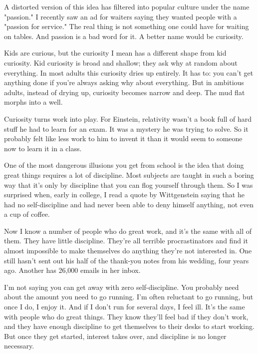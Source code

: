 A distorted version of this idea has
                  filtered into popular culture under the name "passion." I
                  recently saw an ad for waiters saying they wanted people with
                  a "passion for service." The real thing is not something one
                  could have for waiting on tables. And passion is a bad word
                  for it. A better name would be curiosity.

Kids are
                  curious, but the curiosity I mean has a different shape from
                  kid curiosity. Kid curiosity is broad and shallow; they ask
                  why at random about everything. In most adults this curiosity
                  dries up entirely. It has to: you can't get anything done if
                  you're always asking why about everything. But in ambitious
                  adults, instead of drying up, curiosity becomes narrow and
                  deep. The mud flat morphs into a well.

Curiosity
                  turns work into play. For Einstein, relativity wasn't a book
                  full of hard stuff he had to learn for an exam. It was a
                  mystery he was trying to solve. So it probably felt like less
                  work to him to invent it than it would seem to someone now to
                  learn it in a class.

One of the most dangerous
                  illusions you get from school is the idea that doing great
                  things requires a lot of discipline. Most subjects are taught
                  in such a boring way that it's only by discipline that you can
                  flog yourself through them. So I was surprised when, early in
                  college, I read a quote by Wittgenstein saying that he had no
                  self-discipline and had never been able to deny himself
                  anything, not even a cup of coffee.

Now I know a
                  number of people who do great work, and it's the same with all
                  of them. They have little discipline. They're all terrible
                  procrastinators and find it almost impossible to make
                  themselves do anything they're not interested in. One still
                  hasn't sent out his half of the thank-you notes from his
                  wedding, four years ago. Another has 26,000 emails in her
                  inbox.

I'm not saying you can get away with zero
                  self-discipline. You probably need about the amount you need
                  to go running. I'm often reluctant to go running, but once I
                  do, I enjoy it. And if I don't run for several days, I feel
                  ill. It's the same with people who do great things. They know
                  they'll feel bad if they don't work, and they have enough
                  discipline to get themselves to their desks to start working.
                  But once they get started, interest takes over, and discipline
                  is no longer necessary.

